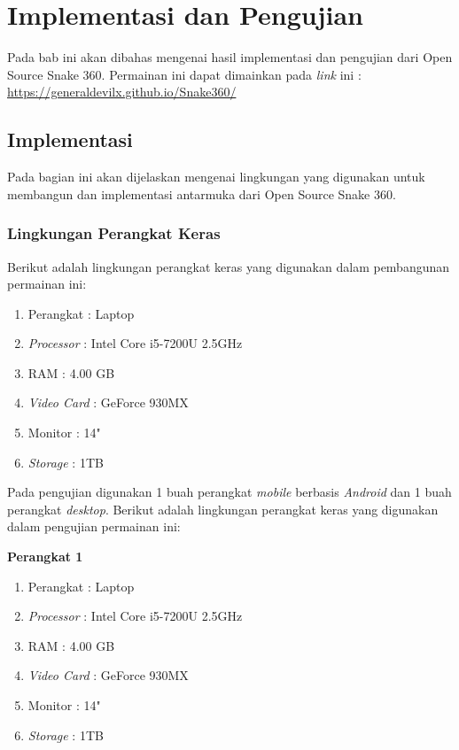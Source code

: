\chapter{Implementasi dan Pengujian}
\label{chap:implementasipengujian}

Pada bab ini akan dibahas mengenai hasil implementasi dan pengujian dari Open Source Snake 360. Permainan ini dapat dimainkan pada \textit{link} ini : \url{https://generaldevilx.github.io/Snake360/}

\section{Implementasi}
Pada bagian ini akan dijelaskan mengenai lingkungan yang digunakan untuk membangun dan implementasi antarmuka dari Open Source Snake 360.

\subsection{Lingkungan Perangkat Keras}
Berikut adalah lingkungan perangkat keras yang digunakan dalam pembangunan permainan ini: 

\begin{enumerate}
	\item Perangkat : Laptop
	\item \textit{Processor} : Intel Core i5-7200U 2.5GHz
	\item RAM : 4.00 GB
	\item \textit{Video Card} : GeForce 930MX
	\item Monitor : 14"
	\item \textit{Storage} : 1TB
\end{enumerate}

Pada pengujian digunakan 1 buah perangkat \textit{mobile} berbasis \textit{Android} dan 1 buah perangkat \textit{desktop}. Berikut adalah lingkungan perangkat keras yang digunakan dalam pengujian permainan ini:

\textbf{Perangkat 1}
\begin{enumerate}
	\item Perangkat : Laptop
	\item \textit{Processor} : Intel Core i5-7200U 2.5GHz
	\item RAM : 4.00 GB
	\item \textit{Video Card} : GeForce 930MX
	\item Monitor : 14"
	\item \textit{Storage} : 1TB
\end{enumerate}

